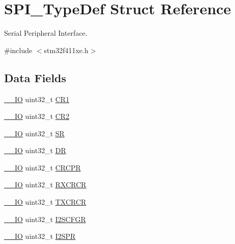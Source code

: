 \hypertarget{struct_s_p_i___type_def}{}\section{S\+P\+I\+\_\+\+Type\+Def Struct Reference}
\label{struct_s_p_i___type_def}


Serial Peripheral Interface.  




{\ttfamily \#include $<$stm32f411xe.\+h$>$}

\subsection*{Data Fields}
\begin{DoxyCompactItemize}
\item 
\hyperlink{core__sc300_8h_aec43007d9998a0a0e01faede4133d6be}{\+\_\+\+\_\+\+IO} uint32\+\_\+t \hyperlink{struct_s_p_i___type_def_a6ecd5cb63b85c381bd67dc90dd4f573a}{C\+R1}
\item 
\hyperlink{core__sc300_8h_aec43007d9998a0a0e01faede4133d6be}{\+\_\+\+\_\+\+IO} uint32\+\_\+t \hyperlink{struct_s_p_i___type_def_a38cb89a872e456e6ecd29b6c71d85600}{C\+R2}
\item 
\hyperlink{core__sc300_8h_aec43007d9998a0a0e01faede4133d6be}{\+\_\+\+\_\+\+IO} uint32\+\_\+t \hyperlink{struct_s_p_i___type_def_a33f3dd6a505d06fe6c466b63be451891}{SR}
\item 
\hyperlink{core__sc300_8h_aec43007d9998a0a0e01faede4133d6be}{\+\_\+\+\_\+\+IO} uint32\+\_\+t \hyperlink{struct_s_p_i___type_def_a02ef206dd5bb270e1f17fedd71284422}{DR}
\item 
\hyperlink{core__sc300_8h_aec43007d9998a0a0e01faede4133d6be}{\+\_\+\+\_\+\+IO} uint32\+\_\+t \hyperlink{struct_s_p_i___type_def_a609d2a279b1927846a991deb9d0dc0b0}{C\+R\+C\+PR}
\item 
\hyperlink{core__sc300_8h_aec43007d9998a0a0e01faede4133d6be}{\+\_\+\+\_\+\+IO} uint32\+\_\+t \hyperlink{struct_s_p_i___type_def_a60f1f0e77c52e89cfd738999bee5c9d0}{R\+X\+C\+R\+CR}
\item 
\hyperlink{core__sc300_8h_aec43007d9998a0a0e01faede4133d6be}{\+\_\+\+\_\+\+IO} uint32\+\_\+t \hyperlink{struct_s_p_i___type_def_a0b5a7f6383eb478bbcc22a36c5e95ae6}{T\+X\+C\+R\+CR}
\item 
\hyperlink{core__sc300_8h_aec43007d9998a0a0e01faede4133d6be}{\+\_\+\+\_\+\+IO} uint32\+\_\+t \hyperlink{struct_s_p_i___type_def_a4a1547c0ed26f31108910c35d2876b83}{I2\+S\+C\+F\+GR}
\item 
\hyperlink{core__sc300_8h_aec43007d9998a0a0e01faede4133d6be}{\+\_\+\+\_\+\+IO} uint32\+\_\+t \hyperlink{struct_s_p_i___type_def_aff2f386a2566c722f7962377b495f1a2}{I2\+S\+PR}
\end{DoxyCompactItemize}


